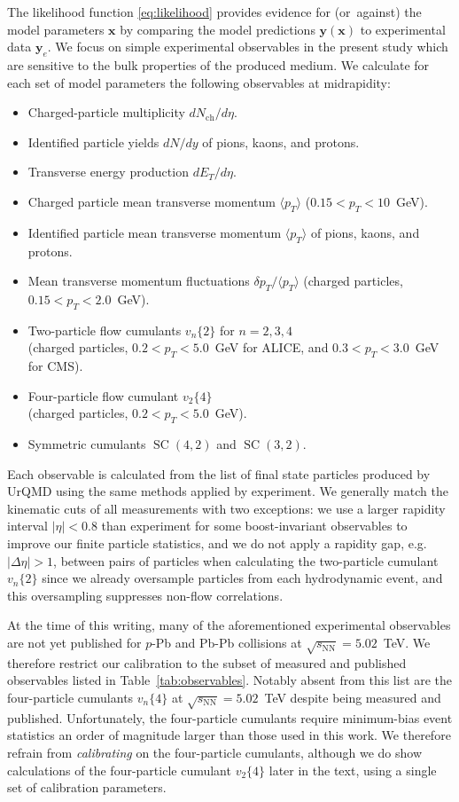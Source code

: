\documentclass[aps,prc,reprint,amsmath,nofootinbib]{revtex4-1}
\newcommand{\sqrts}{\sqrt{s_\mathrm{NN}}}
\newcommand{\nch}{N_\text{ch}}
\newcommand{\vnk}[2]{v_#1\{#2\}}
\newcommand{\xv}{\mathbf x}
\newcommand{\yv}{\mathbf y}
\DeclareMathOperator{\SC}{SC}
\begin{document}
The likelihood function \eqref{eq:likelihood} provides evidence for \mbox{(or against)} the model parameters $\xv$ by comparing the model predictions $\yv(\xv)$ to experimental data $\yv_e$.
We focus on simple experimental observables in the present study which are sensitive to the bulk properties of the produced medium.
We calculate for each set of model parameters the following observables at midrapidity:
\begin{itemize}[leftmargin=1\parindent, itemsep=0pt]
  \item Charged-particle multiplicity $d\nch/d\eta$.
  \item Identified particle yields $dN/dy$ of pions, kaons, and protons.
  \item Transverse energy production $dE_T/d\eta$.
  \item Charged particle mean transverse momentum $\langle p_T \rangle$ ($0.15 < p_T < 10$~GeV).
  \item Identified particle mean transverse momentum $\langle p_T \rangle$ of pions, kaons, and protons.
  \item Mean transverse momentum fluctuations $\delta p_T / \langle p_T \rangle$ (charged particles, $0.15 < p_T < 2.0$~GeV).
  \item Two-particle flow cumulants $\vnk{n}{2}$ for $n=2,3,4$\\ (charged particles, $0.2 < p_T < 5.0$~GeV for ALICE, and $0.3 < p_T < 3.0$~GeV for CMS).
  \item Four-particle flow cumulant $\vnk{2}{4}$ \\(charged particles, $0.2 < p_T < 5.0$~GeV).
  \item Symmetric cumulants $\SC(4, 2)$ and $\SC(3,2)$.
\end{itemize}
Each observable is calculated from the list of final state particles produced by UrQMD using the same methods applied by experiment.
We generally match the kinematic cuts of all measurements with two exceptions: we use a larger rapidity interval $|\eta| < 0.8$ than experiment for some boost-invariant observables to improve our finite particle statistics, and we do not apply a rapidity gap, e.g.\ $|\Delta \eta| > 1$, between pairs of particles when calculating the two-particle cumulant $\vnk{n}{2}$ since we already oversample particles from each hydrodynamic event, and this oversampling suppresses non-flow correlations.

At the time of this writing, many of the aforementioned experimental observables are not yet published for $p$-Pb and Pb-Pb collisions at $\sqrts=5.02$~TeV.
We therefore restrict our calibration to the subset of measured and published observables listed in Table~\ref{tab:observables}.
Notably absent from this list are the four-particle cumulants $\vnk{n}{4}$ at $\sqrts=5.02$~TeV despite being measured and published.
Unfortunately, the four-particle cumulants require minimum-bias event statistics an order of magnitude larger than those used in this work.
We therefore refrain from \emph{calibrating} on the four-particle cumulants, although we do show calculations of the four-particle cumulant $\vnk{2}{4}$ later in the text, using a single set of calibration parameters.
\end{document}
